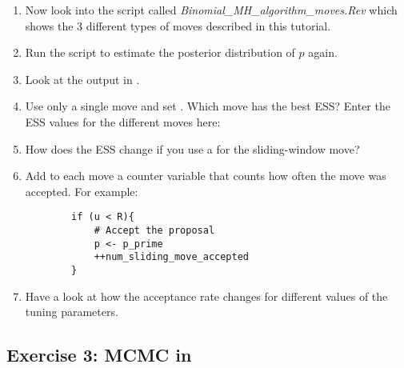 \begin{enumerate}[label=\textnormal{\arabic*)}]
	\item Now look into the script called \emph{Binomial\_MH\_algorithm\_moves.Rev} which shows the 3 different types of moves described in this tutorial.
	\item Run the script to estimate the posterior distribution of $p$ again.
	\item Look at the output in \Tracer.
	\item Use only a single move and set . Which move has the best ESS? Enter the ESS values for the different moves here:\medskip\\
\TextField[name=mcmc_ESS,,backgroundcolor=TextFieldBackgroundColor,color=TextFieldTextColor,bordercolor=TextFieldBoxColor,height=2cm,width=\TextFieldWidth,multiline=true]{}
	\item How does the ESS change if you use a  for the sliding-window move?\medskip\\
\TextField[name=mcmc_ESS_delta,,backgroundcolor=TextFieldBackgroundColor,color=TextFieldTextColor,bordercolor=TextFieldBoxColor,height=1cm,width=\TextFieldWidth,multiline=true]{}
	\item Add to each move a counter variable that counts how often the move was accepted. For example:
{\tt \begin{snugshade*}
\begin{lstlisting}    
        if (u < R){
            # Accept the proposal
            p <- p_prime
            ++num_sliding_move_accepted
        } \end{lstlisting}
\end{snugshade*}}
	\item Have a look at how the acceptance rate changes for different values of the tuning parameters.\medskip\\
\TextField[name=mcmc_acceptance,,backgroundcolor=TextFieldBackgroundColor,color=TextFieldTextColor,bordercolor=TextFieldBoxColor,height=2cm,width=\TextFieldWidth,multiline=true]{}
\end{enumerate}

\subsection{Exercise 3: MCMC in \RevBayes}

